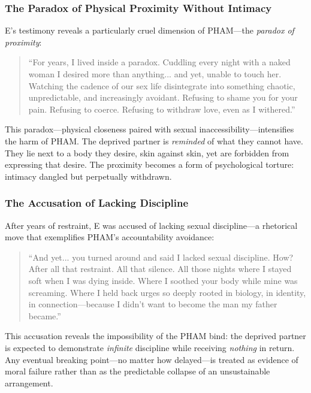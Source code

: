 \documentclass[12pt, letterpaper]{article}
\begin{document}
\subsubsection{The Paradox of Physical Proximity Without Intimacy}

E's testimony reveals a particularly cruel dimension of PHAM---the \textit{paradox of proximity}:

\begin{quote}
``For years, I lived inside a paradox. Cuddling every night with a naked woman I desired more than anything... and yet, unable to touch her. Watching the cadence of our sex life disintegrate into something chaotic, unpredictable, and increasingly avoidant. Refusing to shame you for your pain. Refusing to coerce. Refusing to withdraw love, even as I withered.''
\end{quote}

This paradox---physical closeness paired with sexual inaccessibility---intensifies the harm of PHAM. The deprived partner is \textit{reminded} of what they cannot have. They lie next to a body they desire, skin against skin, yet are forbidden from expressing that desire. The proximity becomes a form of psychological torture: intimacy dangled but perpetually withdrawn.

\subsubsection{The Accusation of Lacking Discipline}

After years of restraint, E was accused of lacking sexual discipline---a rhetorical move that exemplifies PHAM's accountability avoidance:

\begin{quote}
``And yet... you turned around and said I lacked sexual discipline. How? After all that restraint. All that silence. All those nights where I stayed soft when I was dying inside. Where I soothed your body while mine was screaming. Where I held back urges so deeply rooted in biology, in identity, in connection---because I didn't want to become the man my father became.''
\end{quote}

This accusation reveals the impossibility of the PHAM bind: the deprived partner is expected to demonstrate \textit{infinite} discipline while receiving \textit{nothing} in return. Any eventual breaking point---no matter how delayed---is treated as evidence of moral failure rather than as the predictable collapse of an unsustainable arrangement.
\end{document}

